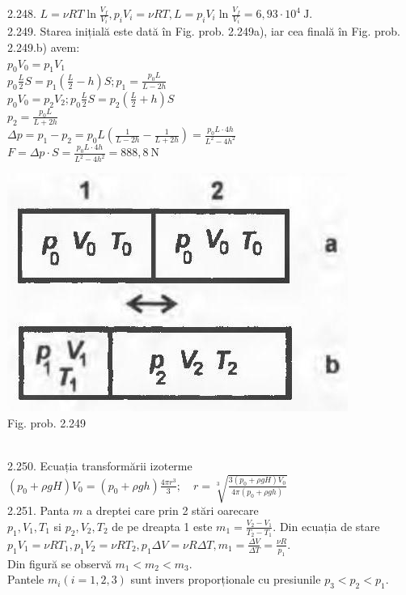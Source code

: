 2.248. $L=\nu R T \ln \frac{V_{f}}{V_{i}}, p_{i} V_{i}=\nu R T, L=p_{i} V_{i} \ln \frac{V_{f}}{V_{i}}=6,93 \cdot 10^{4} \mathrm{~J}$.\\

2.249. Starea inițială este dată în Fig. prob. 2.249a), iar cea finală în Fig. prob. 2.249.b) avem:\\ $p_{0} V_{0}=p_{1} V_{1}$\\ $p_{0} \frac{L}{2} S=p_{1}\left(\frac{L}{2}-h\right) S ; p_{1}=\frac{p_{0} L}{L-2 h}$\\ $p_{0} V_{0}=p_{2} V_{2} ; p_{0} \frac{L}{2} S=p_{2}\left(\frac{L}{2}+h\right) S$\\ $p_{2}=\frac{p_{0} L}{L+2 h}$\\ $\Delta p=p_{1}-p_{2}=p_{0} L\left(\frac{1}{L-2 h}-\frac{1}{L+2 h}\right)=\frac{p_{0} L \cdot 4 h}{L^{2}-4 h^{2}}$\\ $F=\Delta p \cdot S=\frac{p_{0} L \cdot 4 h}{L^{2}-4 h^{2}}=888,8 \mathrm{~N}$\\ \begin{center} \includegraphics[width=0.4\linewidth]{images/2025_07_01_5b3ff9fa0d508c8e9f17g-324}\\ Fig. prob. 2.249 \end{center}\\

2.250. Ecuația transformării izoterme\\ $\left(p_{0}+\rho g H\right) V_{0}=\left(p_{0}+\rho g h\right) \frac{4 \pi r^{3}}{3} ; \quad r=\sqrt[3]{\frac{3\left(p_{0}+\rho g H\right) V_{0}}{4 \pi\left(p_{0}+\rho g h\right)}}$\\

2.251. Panta $m$ a dreptei care prin 2 stări oarecare\\ $p_{1}, V_{1}, T_{1}$ si $p_{2}, V_{2}, T_{2}$ de pe dreapta 1 este $m_{1}=\frac{V_{2}-V_{1}}{T_{2}-T_{1}}$. Din ecuația de stare $p_{1} V_{1}=\nu R T_{1}, p_{1} V_{2}=\nu R T_{2}, p_{1} \Delta V=\nu R \Delta T, m_{1}=\frac{\Delta V}{\Delta T}=\frac{\nu R}{p_{1}}$.\\ Din figură se observă $m_{1}<m_{2}<m_{3}$.\\ Pantele $m_{i}(i=1,2,3)$ sunt invers proporționale cu presiunile $p_{3}<p_{2}<p_{1}$.\\

